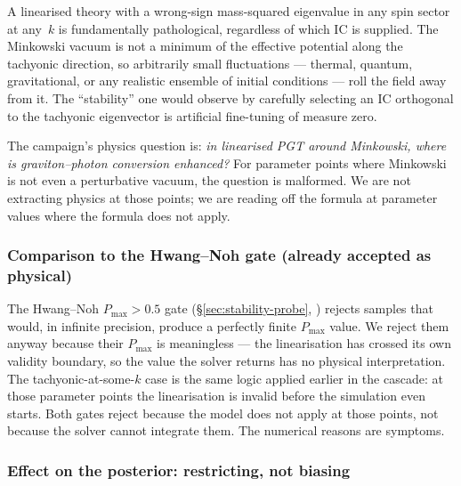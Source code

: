 A linearised theory with a wrong-sign mass-squared eigenvalue in any
spin sector at any~$k$ is fundamentally pathological, regardless of
which IC is supplied. The Minkowski vacuum is not a minimum of the
effective potential along the tachyonic direction, so arbitrarily
small fluctuations --- thermal, quantum, gravitational, or any
realistic ensemble of initial conditions --- roll the field away from
it. The ``stability'' one would observe by carefully selecting an IC
orthogonal to the tachyonic eigenvector is artificial fine-tuning of
measure zero.

The campaign's physics question is: \emph{in linearised PGT around
Minkowski, where is graviton--photon conversion enhanced?} For
parameter points where Minkowski is not even a perturbative vacuum,
the question is malformed. We are not extracting physics at those
points; we are reading off the formula at parameter values where the
formula does not apply.

\subsubsection{Comparison to the Hwang--Noh gate (already accepted
as physical)}

The Hwang--Noh $P_{\max} > 0.5$ gate (\S\ref{sec:stability-probe},
) rejects samples that would, in infinite
precision, produce a perfectly finite $P_{\max}$ value. We reject
them anyway because their $P_{\max}$ is meaningless --- the
linearisation has crossed its own validity boundary, so the value the
solver returns has no physical interpretation. The tachyonic-at-some-$k$
case is the same logic applied earlier in the cascade: at those
parameter points the linearisation is invalid before the simulation
even starts. Both gates reject because the model does not apply at
those points, not because the solver cannot integrate them. The
numerical reasons are symptoms.

\subsubsection{Effect on the posterior: restricting, not biasing}

